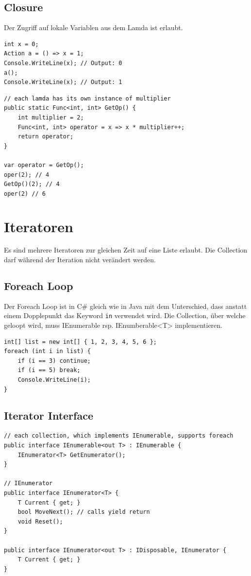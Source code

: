\subsection{Closure}
Der Zugriff auf lokale Variablen aus dem Lamda ist erlaubt. 
\begin{lstlisting}
int x = 0;
Action a = () => x = 1;
Console.WriteLine(x); // Output: 0
a();
Console.WriteLine(x); // Output: 1
\end{lstlisting}

\begin{lstlisting}
// each lamda has its own instance of multiplier
public static Func<int, int> GetOp() {
	int multiplier = 2;
	Func<int, int> operator = x => x * multiplier++;
	return operator;
}

var operator = GetOp();
oper(2); // 4
GetOp()(2); // 4
oper(2) // 6
\end{lstlisting}


\section{Iteratoren}
Es sind mehrere Iteratoren zur gleichen Zeit auf eine Liste erlaubt. Die Collection darf während der Iteration nicht verändert werden. 

\subsection{Foreach Loop}
Der Foreach Loop ist in C\# gleich wie in Java mit dem Unterschied, dass anstatt einem Dopplepunkt das Keyword \lstinline|in| verwendet wird. Die Collection, über welche geloopt wird, muss IEnumerable rsp. IEnumberable<T> implementieren. 
\begin{lstlisting}
int[] list = new int[] { 1, 2, 3, 4, 5, 6 };
foreach (int i in list) {
	if (i == 3) continue;
	if (i == 5) break;
	Console.WriteLine(i);
}
\end{lstlisting}

\subsection{Iterator Interface}
\begin{lstlisting}
// each collection, which implements IEnumerable, supports foreach
public interface IEnumerable<out T> : IEnumerable {
	IEnumerator<T> GetEnumerator();
}

// IEnumerator
public interface IEnumerator<T> {
	T Current { get; }
	bool MoveNext(); // calls yield return
	void Reset();
}

public interface IEnumerator<out T> : IDisposable, IEnumerator {
	T Current { get; }
}
\end{lstlisting}

